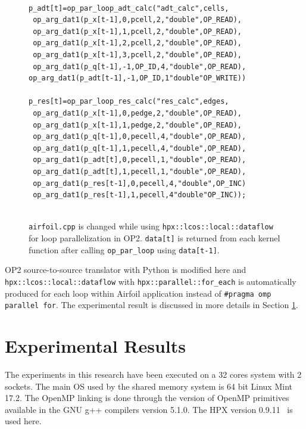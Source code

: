 \documentclass[conference]{IEEEtran}
\begin{document}
\begin{figure} 
    \begin{lstlisting}
    
p_adt[t]=op_par_loop_adt_calc("adt_calc",cells, 
 op_arg_dat1(p_x[t-1],0,pcell,2,"double",OP_READ),
 op_arg_dat1(p_x[t-1],1,pcell,2,"double",OP_READ),
 op_arg_dat1(p_x[t-1],2,pcell,2,"double",OP_READ),
 op_arg_dat1(p_x[t-1],3,pcell,2,"double",OP_READ),
 op_arg_dat1(p_q[t-1],-1,OP_ID,4,"double",OP_READ),
op_arg_dat1(p_adt[t-1],-1,OP_ID,1"double"OP_WRITE))

p_res[t]=op_par_loop_res_calc("res_calc",edges, 
 op_arg_dat1(p_x[t-1],0,pedge,2,"double",OP_READ),
 op_arg_dat1(p_x[t-1],1,pedge,2,"double",OP_READ),
 op_arg_dat1(p_q[t-1],0,pecell,4,"double",OP_READ),
 op_arg_dat1(p_q[t-1],1,pecell,4,"double",OP_READ),
 op_arg_dat1(p_adt[t],0,pecell,1,"double",OP_READ),
 op_arg_dat1(p_adt[t],1,pecell,1,"double",OP_READ),
 op_arg_dat1(p_res[t-1],0,pecell,4,"double",OP_INC)
 op_arg_dat1(p_res[t-1],1,pecell,4"double"OP_INC));
  
    \end{lstlisting}
    \caption{\small{\texttt{airfoil.cpp} is changed while using \texttt{hpx::lcos::local::dataflow} for loop parallelization in OP2. \texttt{data[t]} is returned from each kernel function after calling \texttt{op\_par\_loop} using \texttt{data[t-1]}.}}
    \label{l3c}
\end{figure}



OP2 source-to-source translator with Python is modified here and \texttt{hpx::lcos::local::dataflow} with  \texttt{hpx::parallel::for\_each} is automatically produced for each loop within Airfoil application instead of \texttt{\#pragma omp parallel for}. The experimental result is discussed in more details in Section \ref{sec:res}.



\section{Experimental Results}
\label{sec:res}

The experiments in this research have been executed on a 32 cores system with 2 sockets. The main OS used by the shared memory system is 64 bit Linux Mint 17.2. The OpenMP linking is done through the version of OpenMP primitives available in the GNU g++ compilers version 5.1.0. The HPX version 0.9.11~\cite{hpx_v0.9.11} is used here.
 
\end{document}
